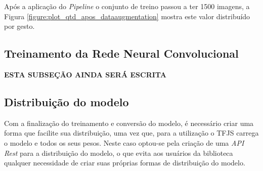 \par Após a aplicação do \textit{Pipeline} o conjunto de treino passou a ter 1500 imagens, a Figura \ref{figure:plot_qtd_apos_dataaugmentation} mostra este valor distribuído por gesto.


\subsection{Treinamento da Rede Neural Convolucional}

\textbf{ESTA SUBSEÇÃO AINDA SERÁ ESCRITA}







\subsection{Distribuição do modelo}

\par Com a finalização do treinamento e conversão do modelo, é necessário criar uma forma que facilite sua distribuição, uma vez que, para a utilização o TFJS carrega o modelo e todos os seus pesos. Neste caso optou-se pela criação de uma \textit{API Rest} para a distribuição do modelo, o que evita aos usuários da biblioteca qualquer necessidade de criar suas próprias formas de distribuição do modelo.

